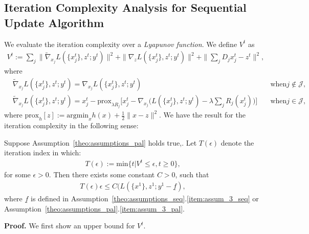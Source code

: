 \subsection{Iteration Complexity Analysis for Sequential Update Algorithm}
We evaluate the iteration complexity over a \emph{Lyapunov function}. We define $V^t$ as
\begin{align}
    V^t:=\sum_j \|\tilde{\nabla}_{x_j} L(\{x^t_j\}, z^t; y^t)\|^2 + \|\nabla_z L(\{x^t_j\}, z^t; y^t)\|^2 + \|\sum_j D_jx_j^t - z^t\|^2,\label{eq:Lyapunov}
\end{align}
where
\begin{align}
    & \tilde{\nabla}_{x_j} L(\{x^t_j\}, z^t; y^t) = \nabla_{x_j} L(\{x^t_j\}, z^t; y^t)\quad &\text{when} j\not\in\mathcal{J},\nonumber\\
    & \tilde{\nabla}_{x_j} L(\{x^t_j\}, z^t; y^t) = x_j^t - \text{prox}_{\lambda R_j} \big[x_j^t-\nabla_{x_j}\big(L(\{x^t_j\}, z^t; y^t) - \lambda\sum_j R_j(x_j^t)\big)\big] \quad &\text{when} j\in\mathcal{J},\nonumber
\end{align}
where $\text{prox}_h[z] := \text{argmin}_x h(x)+\frac{1}{2}\|x-z\|^2$.  We have the result for the iteration complexity in the following sense: 
\begin{theorem}\label{theo:iter_complexity}
    Suppose Assumption~\ref{theo:assumptions_pal} holds true,. Let $T(\epsilon)$ denote the iteration index in which:
    \begin{align}
        T(\epsilon):=\text{min}\{t|V^t\le\epsilon, t\ge0\},\nonumber
    \end{align}
    for some $\epsilon>0$. Then there exists some constant $C>0$, such that 
    \begin{align}
        T(\epsilon)\epsilon\le C(L(\{x^1\}, z^1; y^1 - \underline{f}),
    \end{align} 
    where $\underline{f}$ is defined in Assumption~\ref{theo:assumptions_seq}.\ref{item:assum_3_seq} or Assumption~\ref{theo:assumptions_pal}.\ref{item:assum_3_pal}.
\end{theorem}
{\bf Proof.} We first show an upper bound for $V^t$. 

